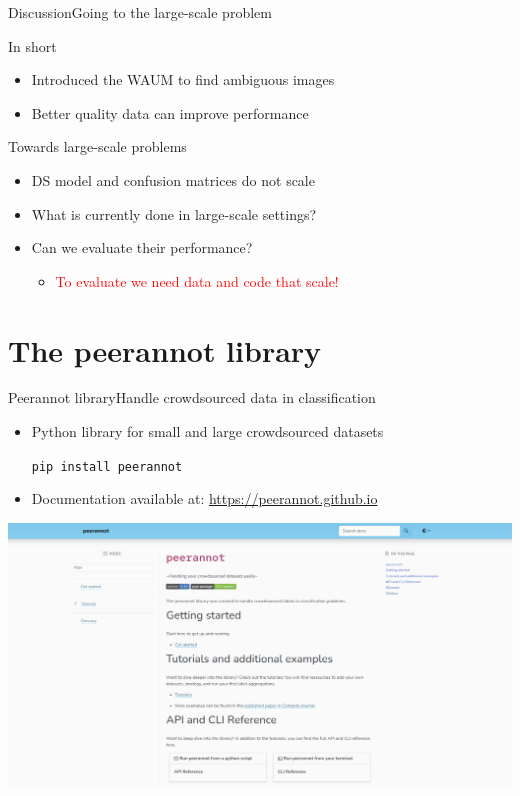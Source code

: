 \begin{frame}{Discussion}{Going to the large-scale problem}
\begin{block}{In short}
\begin{itemize}
    \item Introduced the WAUM to find ambiguous images
    \item Better quality data can improve performance
\end{itemize}
\end{block}

\pause
\begin{block}{Towards large-scale problems}
\begin{itemize}
    \item DS model and confusion matrices do not scale
    \item What is currently done in large-scale settings?
    \item Can we evaluate their performance?
    \begin{itemize}
    \item<3> \textcolor{red}{To evaluate we need data and code that scale!}
    \end{itemize}
\end{itemize}
\end{block}
\end{frame}

\section{The peerannot library}

\begin{frame}{Peerannot library}{Handle crowdsourced data in classification}
    \begin{itemize}
        \item Python library for small and large crowdsourced datasets
        \begin{center} \texttt{pip install peerannot}\end{center}
        \item Documentation available at: \url{https://peerannot.github.io}
    \end{itemize}
    \begin{center}
        \includegraphics[width=\textwidth]{./images/peerannot_web.png}
    \end{center}
\end{frame}

